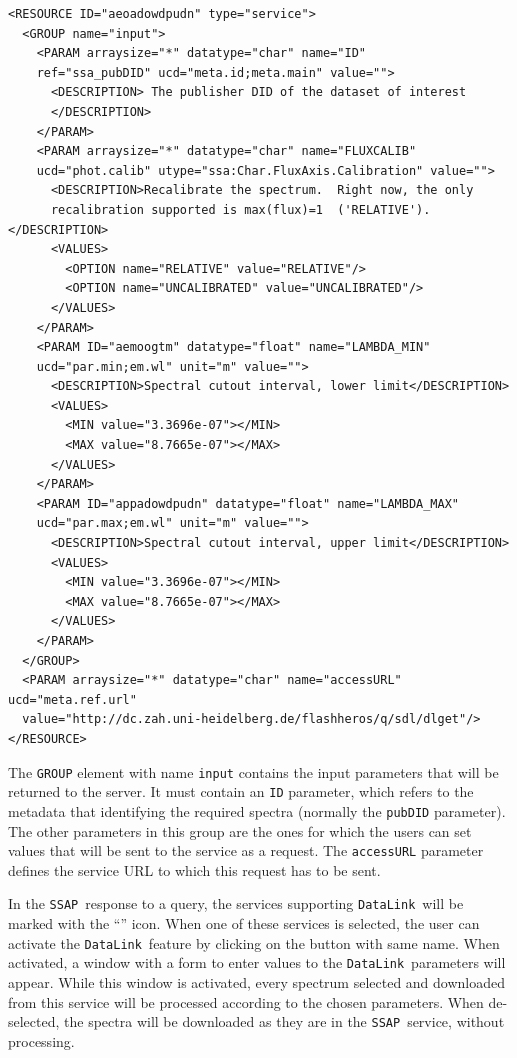 \documentclass[final,authoryear,5p,times,twocolumn]{elsarticle}
\newcommand{\datalink}{\texttt{DataLink}}
\newcommand{\ssap}{\texttt{SSAP}}
\begin{document}
{\tiny
\begin{minipage}{\textwidth}
\begin{verbatim}
<RESOURCE ID="aeoadowdpudn" type="service">
  <GROUP name="input">
    <PARAM arraysize="*" datatype="char" name="ID"
    ref="ssa_pubDID" ucd="meta.id;meta.main" value="">
      <DESCRIPTION> The publisher DID of the dataset of interest
      </DESCRIPTION>
    </PARAM>
    <PARAM arraysize="*" datatype="char" name="FLUXCALIB"
    ucd="phot.calib" utype="ssa:Char.FluxAxis.Calibration" value="">
      <DESCRIPTION>Recalibrate the spectrum.  Right now, the only
      recalibration supported is max(flux)=1  ('RELATIVE').</DESCRIPTION>
      <VALUES>
        <OPTION name="RELATIVE" value="RELATIVE"/>
        <OPTION name="UNCALIBRATED" value="UNCALIBRATED"/>
      </VALUES>
    </PARAM>
    <PARAM ID="aemoogtm" datatype="float" name="LAMBDA_MIN"
    ucd="par.min;em.wl" unit="m" value="">
      <DESCRIPTION>Spectral cutout interval, lower limit</DESCRIPTION>
      <VALUES>
        <MIN value="3.3696e-07"></MIN>
        <MAX value="8.7665e-07"></MAX>
      </VALUES>
    </PARAM>
    <PARAM ID="appadowdpudn" datatype="float" name="LAMBDA_MAX"
    ucd="par.max;em.wl" unit="m" value="">
      <DESCRIPTION>Spectral cutout interval, upper limit</DESCRIPTION>
      <VALUES>
        <MIN value="3.3696e-07"></MIN>
        <MAX value="8.7665e-07"></MAX>
      </VALUES>
    </PARAM>
  </GROUP>
  <PARAM arraysize="*" datatype="char" name="accessURL" ucd="meta.ref.url"
  value="http://dc.zah.uni-heidelberg.de/flashheros/q/sdl/dlget"/>
</RESOURCE>
\end{verbatim}

\end{minipage}
}

The \texttt{GROUP} element with name \texttt{input} contains the input
parameters that will be returned to the server.  It must contain an \texttt{ID}
parameter, which refers to the metadata that identifying the required spectra
(normally the \texttt{pubDID} parameter).  The other parameters in this group
are the ones for which the users can set values that will be sent to the
service as a request. The \texttt{accessURL} parameter defines the service URL
to which this request has to be sent.

In the \ssap\ response to a query, the services supporting \datalink\ will be
marked with the  ``''  icon. When one of these services is selected,
the user can activate the \datalink\ feature by clicking on the button with
same name. When activated, a window with a form to enter values to the
\datalink\ parameters will appear. While this window is activated, every
spectrum selected and downloaded from this service will be processed according
to the chosen parameters. When de-selected, the spectra will be downloaded as
they are in the \ssap\ service, without processing.
\end{document}
